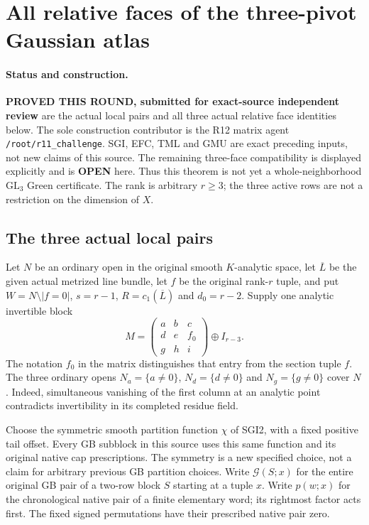 \section{All relative faces of the three-pivot Gaussian atlas}
\label{sec:r12-three-pivot-relative-faces}

\paragraph{Status and construction.}
\textbf{PROVED THIS ROUND, submitted for exact-source independent
review} are the actual local pairs and all three actual relative
face identities below.  The sole construction contributor is the
R12 matrix agent \texttt{/root/r11\_challenge}.  SGI, EFC, TML and
GMU are exact preceding inputs, not new claims of this source.
The remaining three-face compatibility is displayed explicitly and
is \textbf{OPEN} here.  Thus this theorem is not yet a whole-neighborhood
$\mathrm{GL}_3$ Green certificate.  The rank is arbitrary $r\ge3$;
the three active rows are not a restriction on the dimension of $X$.

\subsection{The three actual local pairs}

Let $N$ be an ordinary open in the original smooth $K$-analytic
space, let $\overline L$ be the given actual metrized line bundle,
let $f$ be the original rank-$r$ tuple, and put
$W=N\setminus|f=0|$, $s=r-1$, $R=c_1(\overline L)$ and $d_0=r-2$.
Supply one analytic invertible block
\[
 M=\begin{pmatrix}a&b&c\\d&e&f_0\\g&h&i\end{pmatrix}
                       \oplus I_{r-3}.
 \tag{G3F1}
\]
The notation $f_0$ in the matrix distinguishes that entry from the
section tuple $f$.  The three ordinary opens
$N_a=\{a\ne0\}$, $N_d=\{d\ne0\}$ and $N_g=\{g\ne0\}$ cover $N$.
Indeed, simultaneous vanishing of the first column at an analytic
point contradicts invertibility in its completed residue field.

Choose the symmetric smooth partition function $\chi$ of SGI2,
with a fixed positive tail offset.  Every GB subblock in this source
uses this same function and its original native cap prescriptions.
The symmetry is a new specified choice, not a claim for arbitrary
previous GB partition choices.  Write $\mathcal G(S;x)$ for the
entire original GB pair of a two-row block $S$ starting at a tuple
$x$.  Write $p(w;x)$ for the chronological native pair of a finite
elementary word; its rightmost factor acts first.  The fixed signed
permutations have their prescribed native pair zero.

